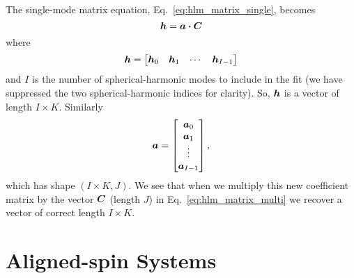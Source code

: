 The single-mode matrix equation, Eq.~\ref{eq:hlm_matrix_single}, becomes
\begin{equation}\label{eq:hlm_matrix_multi}
    \vb*{h} = \vb*{a} \vdot \vb*{C}
\end{equation}
where
\begin{equation}
    \vb*{h} = 
    \begin{bmatrix}
    \vb*{h}_0 & \vb*{h}_1 & \cdots & \vb*{h}_{I-1}
    \end{bmatrix}
\end{equation}
and $I$ is the number of spherical-harmonic modes to include in the fit (we have suppressed the two spherical-harmonic indices for clarity). So, $\vb*{h}$ is a vector of length $I \times K$.
Similarly
\begin{equation}
    \vb*{a} = 
    \begin{bmatrix}
    \vb*{a}_0 \\ \vb*{a}_1 \\ \vdots \\ \vb*{a}_{I-1}
    \end{bmatrix},
\end{equation}
which has shape $(I \times K, J)$. 
We see that when we multiply this new coefficient matrix by the vector $\vb*{C}$ (length $J$) in Eq.~\ref{eq:hlm_matrix_multi} we recover a vector of correct length $I \times K$.

\section{Aligned-spin Systems}\label{aligned-spin-section}



